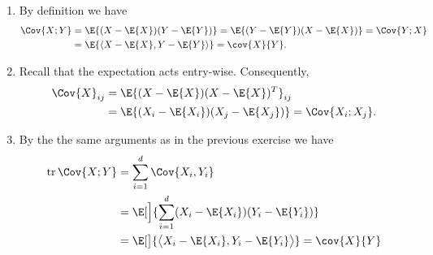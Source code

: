 \begin{solution}
\begin{enumerate}[wide=0pt]
    \item[\ref{it: (covariance matrix) in one dimension}]
    By definition we have
    \begin{align*}
        \Cov{X;Y}
        &= \E{(X-\E{X})(Y-\E{Y})}
        = \E{(Y-\E{Y})(X-\E{X})}
        = \Cov{Y;X}
        \\
        &= \E{\scp{X-\E{X}, Y-\E{Y}}}
        = \cov{X}{Y}.
    \end{align*}

    \item[\ref{it: (covariance matrix) representation}]
    Recall that the expectation acts entry-wise. Consequently,
    \begin{align*}
        \Cov{X}_{ij}
        &= \E{(X - \E{X})(X - \E{X})^\transpose}_{ij}
        \\
        &= \E{(X_i - \E{X_i})(X_j - \E{X_j})}
        = \Cov{X_i; X_j}.
    \end{align*}

    \item[\ref{it: (covariance matrix) vs covariance}]
    By the the same arguments as in the previous exercise we have
    \begin{align*}
        \tr \Cov{X;Y}
        &= \sum_{i=1}^\dims \Cov{X_i, Y_i}
        \\
        &= \E[\Big]{\sum_{i=1}^\dims(X_i-\E{X_i})(Y_i - \E{Y_i})}
        \\
        &= \E[\big]{\scp[\big]{X_i - \E{X_i}, Y_i - \E{Y_i}}}
        = \cov{X}{Y}
    \end{align*}


\end{enumerate}
\end{solution}
